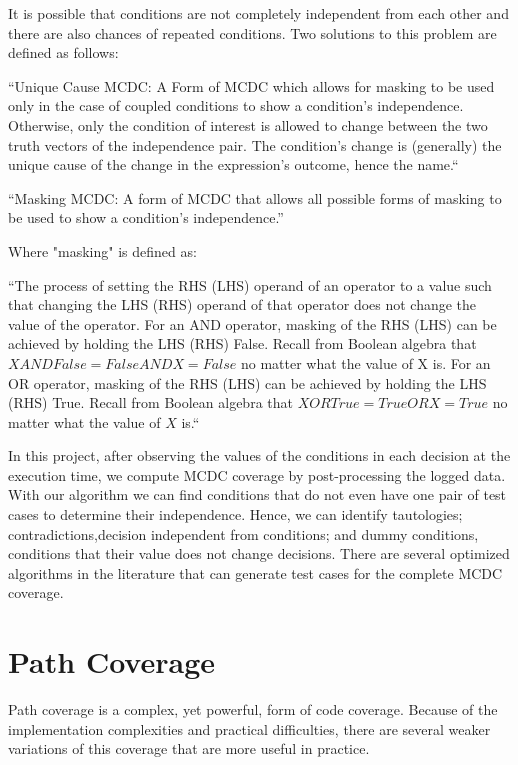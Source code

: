 \documentclass[12pt,a4paper]{report}
\begin{document}
It is possible that conditions are not completely independent from each other and there are also chances of repeated conditions. Two solutions to this problem are defined as follows:

“Unique Cause MCDC: A Form of MCDC which allows for masking to be used only in the case of coupled conditions to show a condition’s independence. Otherwise, only the condition of interest is allowed to change between the two truth vectors of the independence pair. The condition’s change is (generally) the unique cause of the change in the expression’s outcome, hence the name.“\cite{chilenski2001investigation}

“Masking MCDC: A form of MCDC that allows all possible forms of masking to be used to show a condition’s independence.”\cite{chilenski2001investigation}

Where "masking" is defined as:

“The process of setting the RHS (LHS) operand of an operator to a value such that changing the LHS (RHS) operand of that operator does not change the value of the operator. For an AND operator, masking of the RHS (LHS) can be achieved by holding the LHS (RHS) False.  Recall from Boolean algebra that $X AND False = False AND X = False$ no matter what the value of X is. For an OR operator, masking of the RHS (LHS) can be achieved by holding the LHS (RHS) True. Recall from Boolean algebra that $X OR True = True OR X = True$ no matter what the value of $X$ is.“ \cite{chilenski2001investigation}

In this project, after observing the values of the conditions in each decision at the execution time, we compute MCDC coverage by post-processing the logged data. With our algorithm we can find conditions that do not even have one pair of test cases to determine their independence. Hence, we can identify tautologies; contradictions,decision independent from conditions; and dummy conditions, conditions that their value does not change decisions. There are several optimized algorithms in the literature that can generate test cases for the complete MCDC coverage.

\section{Path Coverage}
Path coverage is a complex, yet powerful, form of code coverage. Because of the implementation complexities and practical difficulties, there are several weaker variations of this coverage that are more useful in practice. 
\end{document}
